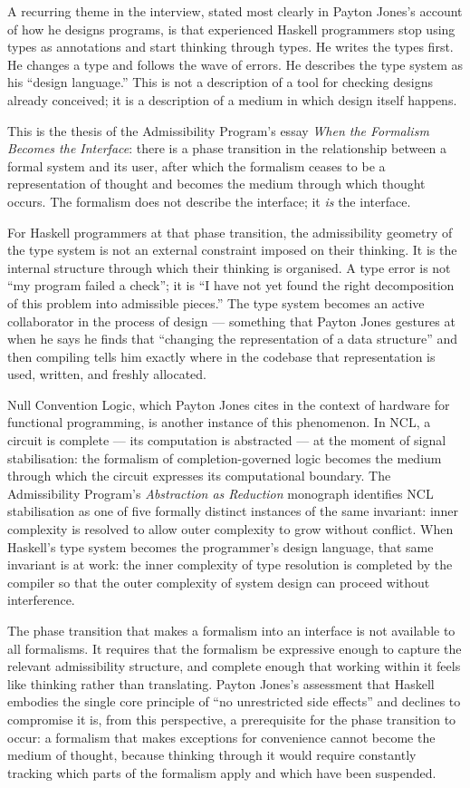 \documentclass[12pt]{article}
\begin{document}
A recurring theme in the interview, stated most clearly in Payton Jones's
account of how he designs programs, is that experienced Haskell programmers
stop using types as annotations and start thinking through types. He writes the
types first. He changes a type and follows the wave of errors. He describes the
type system as his ``design language.'' This is not a description of a tool for
checking designs already conceived; it is a description of a medium in which
design itself happens.

This is the thesis of the Admissibility Program's essay \emph{When the Formalism
Becomes the Interface}: there is a phase transition in the relationship between
a formal system and its user, after which the formalism ceases to be a
representation of thought and becomes the medium through which thought occurs.
The formalism does not describe the interface; it \emph{is} the interface.

For Haskell programmers at that phase transition, the admissibility geometry of
the type system is not an external constraint imposed on their thinking. It is
the internal structure through which their thinking is organised. A type error is
not ``my program failed a check''; it is ``I have not yet found the right
decomposition of this problem into admissible pieces.'' The type system becomes
an active collaborator in the process of design — something that Payton Jones
gestures at when he says he finds that ``changing the representation of a data
structure'' and then compiling tells him exactly where in the codebase that
representation is used, written, and freshly allocated.

Null Convention Logic, which Payton Jones cites in the context of hardware for
functional programming, is another instance of this phenomenon. In NCL, a
circuit is complete — its computation is abstracted — at the moment of signal
stabilisation: the formalism of completion-governed logic becomes the medium
through which the circuit expresses its computational boundary. The Admissibility
Program's \emph{Abstraction as Reduction} monograph identifies NCL stabilisation
as one of five formally distinct instances of the same invariant: inner
complexity is resolved to allow outer complexity to grow without conflict. When
Haskell's type system becomes the programmer's design language, that same
invariant is at work: the inner complexity of type resolution is completed by
the compiler so that the outer complexity of system design can proceed without
interference.

The phase transition that makes a formalism into an interface is not available to
all formalisms. It requires that the formalism be expressive enough to capture
the relevant admissibility structure, and complete enough that working within it
feels like thinking rather than translating. Payton Jones's assessment that
Haskell embodies the single core principle of ``no unrestricted side effects'' and
declines to compromise it is, from this perspective, a prerequisite for the phase
transition to occur: a formalism that makes exceptions for convenience cannot
become the medium of thought, because thinking through it would require constantly
tracking which parts of the formalism apply and which have been suspended.
\end{document}
